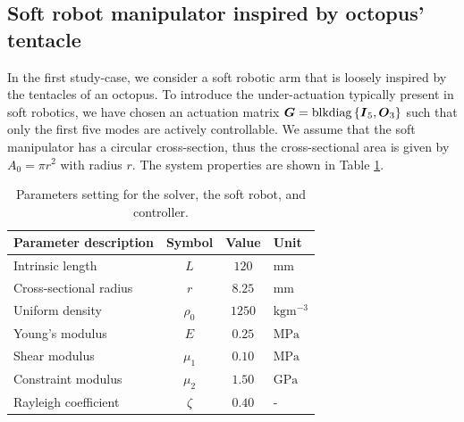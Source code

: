 \subsection{Soft robot manipulator inspired by octopus' tentacle}
In the first study-case, we consider a soft robotic arm that is loosely inspired by the tentacles of an octopus. To introduce the under-actuation typically present in soft robotics, we have chosen an actuation matrix $\boldsymbol{G} = \textnormal{blkdiag}\left\{ {\boldsymbol{I}_5, \boldsymbol{O}_3} \right\}$ such that only the first five modes are actively controllable.  We assume that the soft manipulator has a circular cross-section, thus the cross-sectional area is given by $A_0 = \pi r^2$ with radius $r$. The system properties are shown in Table \ref{tab:C3:parameters1}.
%
\renewcommand\arraystretch{1.15}
\begin{table}[t]
  \vspace{-0.25cm}
  \caption{Parameters setting for the solver, the soft robot, and controller.}\label{tab:C3:parameters1} \centering
  \begin{tabular}{l|ccl}
    \hline
    Parameter description & Symbol & Value & Unit \\
    \hline 
    \hline
    Intrinsic length & $L $ & $ 120$ & mm \\
    Cross-sectional radius & $r $ & $ 8.25$ & $\text{mm}$ \\
    Uniform density & $\rho_0 $ & $ 1250$ & $\text{kg}\text{m}^{-3}$ \\
    Young's modulus & $E $ & $ 0.25$ & $\text{MPa}$ \\
    Shear modulus & $\mu_1 $ & $ 0.10 $ & $\text{MPa}$ \\
    Constraint modulus & $\mu_2 $ & $ 1.50 $ & $\text{GPa}$ \\
    Rayleigh coefficient & $\zeta $ & $ 0.40 $ & - \\
    \hline
  \end{tabular}
  \end{table}
%
